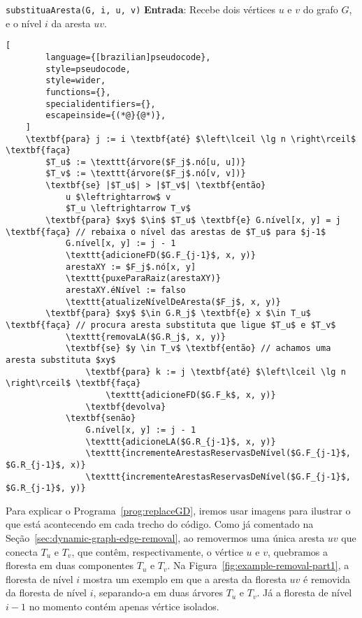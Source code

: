 \begin{programruledcaption}{\texttt{substituaAresta(G, i, u, v)} \label{prog:replaceGD}}
    \noindent\textbf{Entrada}: Recebe dois vértices $u$ e $v$ do grafo $G$, e o nível $i$ da aresta $uv$.
    \vspace{-0.5\baselineskip}
    \begin{lstlisting}[
        language={[brazilian]pseudocode},
        style=pseudocode,
        style=wider,
        functions={},
        specialidentifiers={},
        escapeinside={(*@}{@*)},
    ]
    \textbf{para} j := i \textbf{até} $\left\lceil \lg n \right\rceil$ \textbf{faça}
        $T_u$ := \texttt{árvore($F_j$.nó[u, u])}
        $T_v$ := \texttt{árvore($F_j$.nó[v, v])}    
        \textbf{se} |$T_u$| > |$T_v$| \textbf{então}
            u $\leftrightarrow$ v
            $T_u \leftrightarrow T_v$
        \textbf{para} $xy$ $\in$ $T_u$ \textbf{e} G.nível[x, y] = j \textbf{faça} // rebaixa o nível das arestas de $T_u$ para $j-1$
            G.nível[x, y] := j - 1
            \texttt{adicioneFD($G.F_{j-1}$, x, y)}
            arestaXY := $F_j$.nó[x, y]
            \texttt{puxeParaRaiz(arestaXY)}
            arestaXY.éNível := falso
            \texttt{atualizeNívelDeAresta($F_j$, x, y)}
        \textbf{para} $xy$ $\in G.R_j$ \textbf{e} x $\in T_u$ \textbf{faça} // procura aresta substituta que ligue $T_u$ e $T_v$
            \texttt{removaLA($G.R_j$, x, y)} 
            \textbf{se} $y \in T_v$ \textbf{então} // achamos uma aresta substituta $xy$
                \textbf{para} k := j \textbf{até} $\left\lceil \lg n \right\rceil$ \textbf{faça}
                    \texttt{adicioneFD($G.F_k$, x, y)}
                \textbf{devolva}
            \textbf{senão}
                G.nível[x, y] := j - 1
                \texttt{adicioneLA($G.R_{j-1}$, x, y)}
                \texttt{incrementeArestasReservasDeNível($G.F_{j-1}$, $G.R_{j-1}$, x)}
                \texttt{incrementeArestasReservasDeNível($G.F_{j-1}$, $G.R_{j-1}$, y)}

    \end{lstlisting}
    \vspace{-0.5\baselineskip}
\end{programruledcaption}

Para explicar o Programa~\ref{prog:replaceGD}, iremos usar imagens para ilustrar o que está acontecendo em cada trecho do código. Como já comentado na Seção~\ref{sec:dynamic-graph-edge-removal}, ao removermos uma única aresta $uv$ que conecta $T_u$ e $T_v$, que contêm, respectivamente, o vértice $u$ e $v$, quebramos a floresta em duas componentes $T_u$ e $T_v$. Na Figura~\ref{fig:example-removal-part1}, a floresta de nível $i$ mostra um exemplo em que a aresta da floresta $uv$ é removida da floresta de nível $i$, separando-a em duas árvores $T_u$ e $T_v$. Já a floresta de nível $i-1$ no momento contém apenas vértice isolados.

